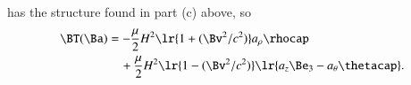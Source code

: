  has the structure found in part (c) above, so
\begin{dmath}\label{eqn:poyntingStaticExamples:1380}
\begin{aligned}
\BT(\Ba)
&=
-\frac{\mu}{2} H^2 \lr{ 1 + (\Bv^2/c^2) } a_\rho \rhocap \\
&\quad +
\frac{\mu}{2} H^2 \lr{ 1 - (\Bv^2/c^2) } \lr{ a_z \Be_3 - a_\theta \thetacap }.
\end{aligned}
\end{dmath}
